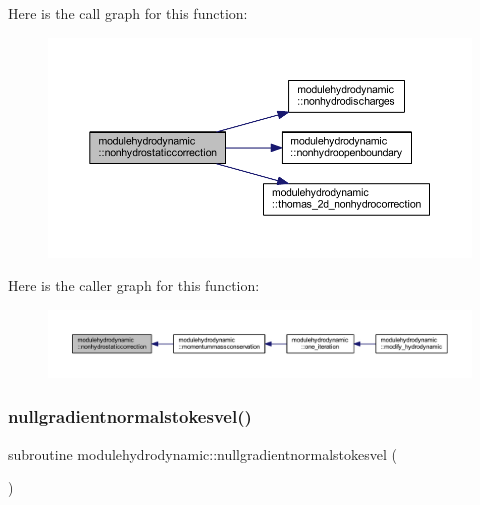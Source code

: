 Here is the call graph for this function\+:\nopagebreak
\begin{figure}[H]
\begin{center}
\leavevmode
\includegraphics[width=350pt]{namespacemodulehydrodynamic_abc8e7cbc6bd77b58f41b41db117c979b_cgraph}
\end{center}
\end{figure}
Here is the caller graph for this function\+:\nopagebreak
\begin{figure}[H]
\begin{center}
\leavevmode
\includegraphics[width=350pt]{namespacemodulehydrodynamic_abc8e7cbc6bd77b58f41b41db117c979b_icgraph}
\end{center}
\end{figure}
\mbox{\label{namespacemodulehydrodynamic_a4ecf50b9477e7ba12adebe7aef0435c9}} 
\subsubsection{\texorpdfstring{nullgradientnormalstokesvel()}{nullgradientnormalstokesvel()}}
{\footnotesize\ttfamily subroutine modulehydrodynamic\+::nullgradientnormalstokesvel (\begin{DoxyParamCaption}{ }\end{DoxyParamCaption})\hspace{0.3cm}{\ttfamily [private]}}

